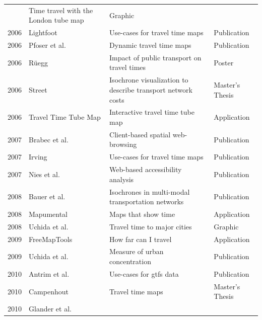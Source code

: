 \begin{table}[htp]
\begin{tabular}{r|l|l|l}
        & Time travel with the London tube map
        & Graphic \\
      2006
        & Lightfoot \cite{Lightfoot2006}
        & Use-cases for travel time maps
        & Publication \\
      2006
        & Pfoser et al. \cite{pfoser2006dynamic}
        & Dynamic travel time maps
        & Publication \\
      2006
        & Rüegg \cite{Ruegg2006}
        & Impact of public transport on travel times
        & Poster \\
      2006
        & Street \cite{street2006timecontours}
        & Isochrone visualization to describe transport network costs
        & Master's Thesis \\
      2006
        & Travel Time Tube Map \cite{Carden2006}
        & Interactive travel time tube map
        & Application \\
      2007
        & Brabec et al. \cite{Brabec2007}
        & Client-based spatial web-browsing
        & Publication \\
      2007
        & Irving \cite{Irving2007}
        & Use-cases for travel time maps
        & Publication \\
      2007
        & Nies et al. \cite{neis2007webbasierte}
        & Web-based accessibility analysis
        & Publication \\
      2008
        & Bauer et al. \cite{bauer2008computing}
        & Isochrones in multi-modal transportation networks
        & Publication \\
      2008
        & Mapumental \cite{Mapumental}
        & Maps that show time
        & Application \\
      2008
        & Uchida et al. \cite{Uchida2008}
        & Travel time to major cities
        & Graphic \\
      2009
        & FreeMapTools \cite{Freemaptools}
        & How far can I travel
        & Application \\
      2009
        & Uchida et al. \cite{uchida2009agglomeration}
        & Measure of urban concentration
        & Publication \\
      2010
        & Antrim et al. \cite{antrim2013many}
        & Use-cases for \acrshort{gtfs} data
        & Publication \\
      2010
        & Campenhout \cite{van2010travel}
        & Travel time maps
        & Master's Thesis \\
      2010
        & Glander et al. \cite{Glander2010}

\end{tabular}
\end{table}
